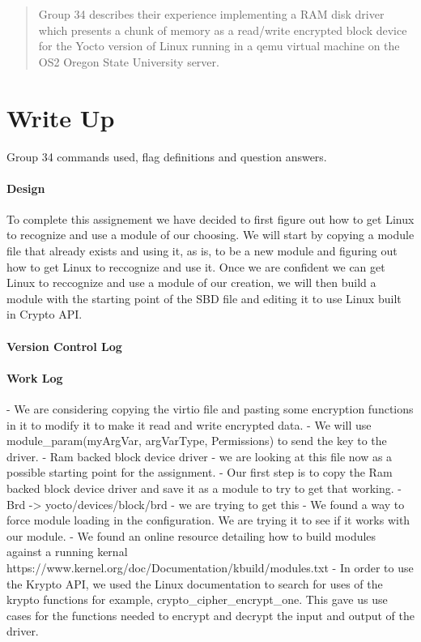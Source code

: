 \documentclass[titlepage,draftclsnofoot,onecolumn]{article}
\begin{document}
\maketitle

\begin{abstract}
  Group 34 describes their experience implementing a RAM disk driver which presents a chunk of memory as a read/write encrypted block device for the Yocto version of Linux running in a qemu virtual machine on the OS2 Oregon State University server.
\end{abstract}

\section*{Write Up}
Group 34 commands used, flag definitions and question answers.

\paragraph{Design}
To complete this assignement we have decided to first figure out how to get Linux to recognize and use a module of our choosing. We will start by copying a module file that already exists and using it, as is, to be a new module and figuring out how to get Linux to reccognize and use it. Once we are confident we can get Linux to reccognize and use a module of our creation, we will then build a module with the starting point of the SBD file and editing it to use Linux built in Crypto API.

\paragraph{Version Control Log}

\paragraph{Work Log}
- We are considering copying the virtio file and pasting some encryption functions in it to modify it to make it read and write encrypted data.
- We will use module_param(myArgVar, argVarType, Permissions) to send the key to the driver.
- Ram backed block device driver - we are looking at this file now as a possible starting point for the assignment.
- Our first step is to copy the Ram backed block device driver and save it as a module to try to get that working.
- Brd -> yocto/devices/block/brd - we are trying to get this
- We found a way to force module loading in the configuration. We are trying it to see if it works with our module.
- We found an online resource detailing how to build modules against a running kernal https://www.kernel.org/doc/Documentation/kbuild/modules.txt
- In order to use the Krypto API, we used the Linux documentation to search for uses of the krypto functions for example, crypto_cipher_encrypt_one. This gave us use cases for the functions needed to encrypt and decrypt the input and output of the driver.
\end{document}
